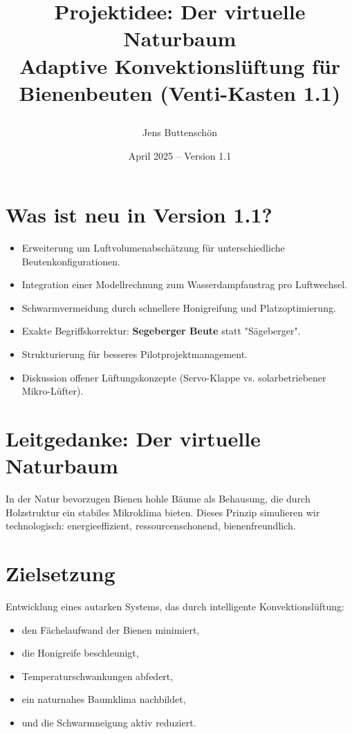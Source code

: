 \documentclass[11pt,a4paper]{article}
\title{\parbox{\linewidth}{\centering\textbf{
Projektidee: Der virtuelle Naturbaum\\
Adaptive Konvektionsl\"uftung f\"ur Bienenbeuten (Venti-Kasten 1.1)}}}
\author{Jens Buttensch\"on}
\date{April 2025 -- Version 1.1}
\begin{document}
\maketitle

\section*{Was ist neu in Version 1.1?}
\begin{itemize}[topsep=2pt]
  \item Erweiterung um Luftvolumenabsch\"atzung f\"ur unterschiedliche Beutenkonfigurationen.
  \item Integration einer Modellrechnung zum Wasserdampfaustrag pro Luftwechsel.
  \item Schwarmvermeidung durch schnellere Honigreifung und Platzoptimierung.
  \item Exakte Begriffskorrektur: \textbf{Segeberger Beute} statt "S\"ageberger".
  \item Strukturierung f\"ur besseres Pilotprojektmanagement.
  \item Diskussion offener L\"uftungskonzepte (Servo-Klappe vs. solarbetriebener Mikro-L\"ufter).
\end{itemize}

\section*{Leitgedanke: Der virtuelle Naturbaum}
In der Natur bevorzugen Bienen hohle B\"aume als Behausung, die durch Holzstruktur ein
stabiles Mikroklima bieten. Dieses Prinzip simulieren wir technologisch:
energieeffizient, ressourcenschonend, bienenfreundlich.

\section{Zielsetzung}
Entwicklung eines autarken Systems, das durch intelligente Konvektionsl\"uftung:
\begin{itemize}[topsep=2pt]
  \item den F\"achelaufwand der Bienen minimiert,
  \item die Honigreife beschleunigt,
  \item Temperaturschwankungen abfedert,
  \item ein naturnahes Baumklima nachbildet,
  \item und die Schwarmneigung aktiv reduziert.
\end{itemize}
\end{document}
